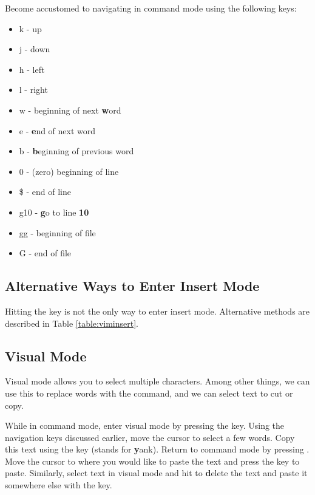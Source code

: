 \begin{problem}
Become accustomed to navigating in command mode using the following keys:
\begin{itemize}
\item k - up 
\item j - down
\item h - left 
\item l - right
\item w - beginning of next \textbf{w}ord
\item e - \textbf{e}nd of next word
\item b - \textbf{b}eginning of previous word
\item 0 - (zero) beginning of line
\item \$ - end of line
\item g10 - \textbf{g}o to line \textbf{10} 
\item gg - beginning of file
\item G - end of file
\end{itemize}
\end{problem}


\subsection*{Alternative Ways to Enter Insert Mode}
Hitting the  key is not the only way to enter insert mode. 
Alternative methods are described in Table \ref{table:viminsert}.

\subsection*{Visual Mode}
Visual mode allows you to select multiple characters. Among other things, we can use this to replace words with the  command, and we can select text to cut or copy.

\begin{problem}
While in command mode, enter visual mode by pressing the  key. Using the navigation keys discussed earlier, move the cursor to select a few words. Copy this text using the  key (stands for \textbf{y}ank). Return to command mode by pressing . Move the cursor to where you would like to paste the text and press the  key to paste. Similarly, select text in visual mode and hit  to \textbf{d}elete the text and paste it somewhere else with the  key.
\end{problem}

